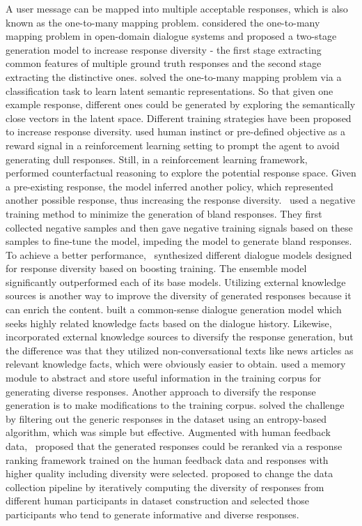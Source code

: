 A user message can be mapped into multiple acceptable responses, which is also known as the one-to-many mapping problem.  considered the one-to-many mapping problem in open-domain dialogue systems and proposed a two-stage generation model to increase response diversity - the first stage extracting common features of multiple ground truth responses and the second stage extracting the distinctive ones.  solved the one-to-many mapping problem via a classification task to learn latent semantic representations. So that given one example response, different ones could be generated by exploring the semantically close vectors in the latent space. 
Different training strategies have been proposed to increase response diversity.  used human instinct or pre-defined objective as a reward signal in a reinforcement learning setting to prompt the agent to avoid generating dull responses. Still, in a reinforcement learning framework,~ performed counterfactual reasoning to explore the potential response space. Given a pre-existing response, the model inferred another policy, which represented another possible response, thus increasing the response diversity.~ used a negative training method to minimize the generation of bland responses. They first collected negative samples and then gave negative training signals based on these samples to fine-tune the model, impeding the model to generate bland responses. To achieve a better performance,~ synthesized different dialogue models designed for response diversity based on boosting training. The ensemble model significantly outperformed each of its base models. 
Utilizing external knowledge sources is another way to improve the diversity of generated responses because it can enrich the content.  built a common-sense dialogue generation model which seeks highly related knowledge facts based on the dialogue history. Likewise,~ incorporated external knowledge sources to diversify the response generation, but the difference was that they utilized non-conversational texts like news articles as relevant knowledge facts, which were obviously easier to obtain.  used a memory module to abstract and store useful information in the training corpus for generating diverse responses. 
Another approach to diversify the response generation is to make modifications to the training corpus.  solved the challenge by filtering out the generic responses in the dataset using an entropy-based algorithm, which was simple but effective. Augmented with human feedback data,~ proposed that the generated responses could be reranked via a response ranking framework trained on the human feedback data and responses with higher quality including diversity were selected.  proposed to change the data collection pipeline by iteratively computing the diversity of responses from different human participants in dataset construction and selected those participants who tend to generate informative and diverse responses.

